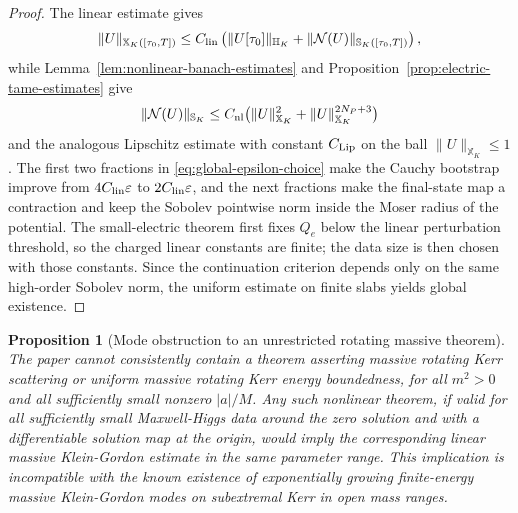 \documentclass[11pt]{article}
\numberwithin{equation}{section}
\theoremstyle{plain}
\newtheorem{proposition}[theorem]{Proposition}
\theoremstyle{definition}
\theoremstyle{remark}
\begin{document}
\begin{proof}
The linear estimate gives
\begin{equation}
 \|U\|_{\mathbb X_K([\tau_0,T])}
 \le C_{\rm lin}\left(\|U[\tau_0]\|_{\mathbb H_K}
 +\|\mathcal N(U)\|_{\mathbb S_K([\tau_0,T])}\right),
\end{equation}
while Lemma~\ref{lem:nonlinear-banach-estimates} and Proposition~\ref{prop:electric-tame-estimates} give
\begin{equation}
 \|\mathcal N(U)\|_{\mathbb S_K}
 \le C_{\rm nl}\bigl(\|U\|_{\mathbb X_K}^2+\|U\|_{\mathbb X_K}^{2N_P+3}\bigr)
\end{equation}
and the analogous Lipschitz estimate with constant \(C_{\rm Lip}\) on the ball \(\|U\|_{\mathbb X_K}\le1\).  The first two fractions in \eqref{eq:global-epsilon-choice} make the Cauchy bootstrap improve from \(4C_{\rm lin}\varepsilon\) to \(2C_{\rm lin}\varepsilon\), and the next fractions make the final-state map a contraction and keep the Sobolev pointwise norm inside the Moser radius of the potential.  The small-electric theorem first fixes \(Q_e\) below the linear perturbation threshold, so the charged linear constants are finite; the data size is then chosen with those constants.  Since the continuation criterion depends only on the same high-order Sobolev norm, the uniform estimate on finite slabs yields global existence.
\end{proof}

\begin{proposition}[Mode obstruction to an unrestricted rotating massive theorem]\label{prop:sharp-massive-obstruction}
The paper cannot consistently contain a theorem asserting massive rotating Kerr scattering or uniform massive rotating Kerr energy boundedness, for all \(m^2>0\) and all sufficiently small nonzero \(|a|/M\).  Any such nonlinear theorem, if valid for all sufficiently small Maxwell-Higgs data around the zero solution and with a differentiable solution map at the origin, would imply the corresponding linear massive Klein-Gordon estimate in the same parameter range.  This implication is incompatible with the known existence of exponentially growing finite-energy massive Klein-Gordon modes on subextremal Kerr in open mass ranges.
\end{proposition}
\end{document}
